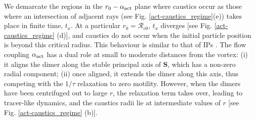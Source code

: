\documentclass[../Rajarshi-thesis-draft.tex]{subfiles}
\begin{document}
We demarcate the regions in the $r_0-\alpha_{\rm act}$ plane where caustics occur as those where an intersection of adjacent rays (see Fig. \ref{act-caustics_regime}(e)) takes place in finite time, $t_x$. 
At a particular $r_0=\mathcal{R}_{c0}$, $t_x$ diverges [see Fig. \ref{act-caustics_regime} (d)], and caustics do not occur when the initial particle position is beyond this critical radius. %
This behaviour is similar to that of IPs \cite{Croor2015}. 
The flow coupling $\alpha_{\rm act}$ has a dual role at small to moderate distances from the vortex: (i) it aligns the dimer along the stable principal axis of $\mathbf{S}$, which has a non-zero radial component; (ii) once aligned, it extends the dimer along this axis, thus competing with the $1/\tau$ relaxation to zero motility. However, when the dimers have been centrifuged out to large $r$, the relaxation term takes over, leading to tracer-like dynamics, and the caustics radii lie at intermediate values of $r$ [see Fig. \ref{act-caustics_regime} (b)].
\end{document}
